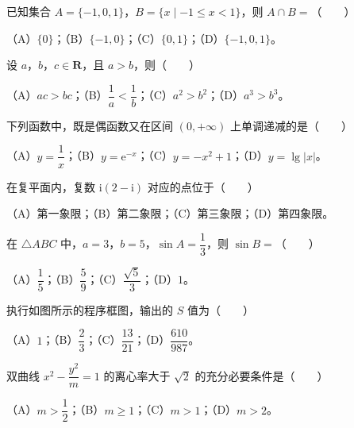 \begin{question}
已知集合 $A=\{-1,0,1\}$，$B=\{x\mid-1\leqslant x<1\}$，则 $A\cap B=$\mbox{（　　）}

（A）$\{0\}$；（B）$\{-1,0\}$；（C）$\{0,1\}$；（D）$\{-1,0,1\}$。

\end{question}
\begin{question}
设 $a$，$b$，$c\in\mathbf R$，且 $a>b$，则\mbox{（　　）}

（A）$ac>bc$；（B）$\dfrac1a<\dfrac1b$；（C）$a^2>b^2$；（D）$a^3>b^3$。

\end{question}
\begin{question}
下列函数中，既是偶函数又在区间 $(0,+\infty)$ 上单调递减的是\mbox{（　　）}

（A）$y=\dfrac1x$；（B）$y=\mathrm e^{-x}$；（C）$y=-x^2+1$；（D）$y=\lg|x|$。

\end{question}
\begin{question}
在复平面内，复数 $\mathrm i(2-\mathrm i)$ 对应的点位于\mbox{（　　）}

（A）第一象限；（B）第二象限；（C）第三象限；（D）第四象限。

\end{question}
\begin{question}
在 $\triangle ABC$ 中，$a=3$，$b=5$，$\sin A=\dfrac13$，则 $\sin B=$\mbox{（　　）}

（A）$\dfrac15$；（B）$\dfrac59$；（C）$\dfrac{\sqrt5}3$；（D）$1$。

\Needspace{0.4\textheight}
\end{question}
\begin{question}
执行如图所示的程序框图，输出的 $S$ 值为\mbox{（　　）}
\nopagebreak[4]
\begin{center}\end{center}
\nopagebreak[4]
（A）$1$；（B）$\dfrac23$；（C）$\dfrac{13}{21}$；（D）$\dfrac{610}{987}$。

\end{question}
\begin{question}
双曲线 $x^2-\dfrac{y^2}m=1$ 的离心率大于 $\sqrt2$ 的充分必要条件是\mbox{（　　）}

（A）$m>\dfrac12$；（B）$m\geqslant1$；（C）$m>1$；（D）$m>2$。

\Needspace{0.4\textheight}
\end{question}
